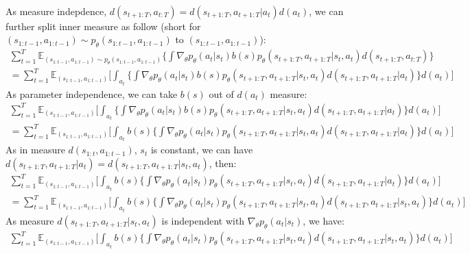 \documentclass[12pt]{article}
\begin{document}
\begin{enumerate} [label=(\alph*)]
\begin{enumerate}[label=(\alph*)]
\begin{multline}
\end{multline}
 As measure indepdence, $d(s_{t+1:T}, a_{t:T}) = d(s_{t+1:T}, a_{t+1:T} | a_t) d(a_t)$, we can further split inner measure as follow (short for $(s_{1:t-1},a_{1:t-1}) \sim p_\theta(s_{1:t-1},a_{1:t-1})$ to $(s_{1:t-1},a_{1:t-1}) $):
  \begin{multline}
 \sum_{t=1}^T \mathbb{E}_{(s_{1:t-1},a_{1:t-1}) \sim p_\theta(s_{1:t-1},a_{1:t-1})} \lbrace \int \nabla_\theta p_\theta(a_t|s_t) b(s) p_\theta(s_{t+1:T}, a_{t+1:T} | s_t, a_t ) d(s_{t+1:T}, a_{t:T})\rbrace \\
 = \sum_{t=1}^T \mathbb{E}_{(s_{1:t-1},a_{1:t-1}) } \lbrack \int_{a_t} \lbrace \int \nabla_\theta p_\theta(a_t|s_t) b(s) p_\theta(s_{t+1:T}, a_{t+1:T} | s_t, a_t ) d(s_{t+1:T}, a_{t+1:T} | a_t)\rbrace d(a_t)\rbrack
 \end{multline}
As parameter independence, we can take $b(s)$ out of $d(a_t)$ measure:
 \begin{multline}
 \sum_{t=1}^T \mathbb{E}_{(s_{1:t-1},a_{1:t-1}) } \lbrack \int_{a_t} \lbrace \int \nabla_\theta p_\theta(a_t|s_t) b(s) p_\theta(s_{t+1:T}, a_{t+1:T} | s_t, a_t ) d(s_{t+1:T}, a_{t+1:T} | a_t)\rbrace d(a_t)\rbrack \\
= \sum_{t=1}^T \mathbb{E}_{(s_{1:t-1},a_{1:t-1}) } \lbrack \int_{a_t}  b(s) \lbrace \int \nabla_\theta p_\theta(a_t|s_t)  p_\theta(s_{t+1:T}, a_{t+1:T} | s_t, a_t ) d(s_{t+1:T}, a_{t+1:T} | a_t)\rbrace d(a_t)\rbrack
\end{multline}
As in measure $d(s_{1:t}, a_{1:t-1})$, $s_t$ is constant, we can have $d(s_{t+1:T}, a_{t+1:T} | a_t) = d(s_{t+1:T}, a_{t+1:T} | s_t, a_t) $, then:
 \begin{multline}
\sum_{t=1}^T \mathbb{E}_{(s_{1:t-1},a_{1:t-1}) } \lbrack \int_{a_t}  b(s) \lbrace \int \nabla_\theta p_\theta(a_t|s_t)  p_\theta(s_{t+1:T}, a_{t+1:T} | s_t, a_t ) d(s_{t+1:T}, a_{t+1:T} | a_t)\rbrace d(a_t)\rbrack \\
= \sum_{t=1}^T \mathbb{E}_{(s_{1:t-1},a_{1:t-1}) } \lbrack \int_{a_t}  b(s) \lbrace \int \nabla_\theta p_\theta(a_t|s_t)  p_\theta(s_{t+1:T}, a_{t+1:T} | s_t, a_t ) d(s_{t+1:T}, a_{t+1:T} | s_t, a_t)\rbrace d(a_t)\rbrack
\end{multline}
As measure $d(s_{t+1:T}, a_{t+1:T} | s_t, a_t) $ is independent with $\nabla_\theta p_\theta(a_t|s_t)$, we have:
 \begin{multline}
\sum_{t=1}^T \mathbb{E}_{(s_{1:t-1},a_{1:t-1}) } \lbrack \int_{a_t}  b(s) \lbrace \int \nabla_\theta p_\theta(a_t|s_t)  p_\theta(s_{t+1:T}, a_{t+1:T} | s_t, a_t ) d(s_{t+1:T}, a_{t+1:T} | s_t, a_t)\rbrace d(a_t)\rbrack \\

\end{multline}
\end{enumerate}
\end{enumerate}
\end{document}
